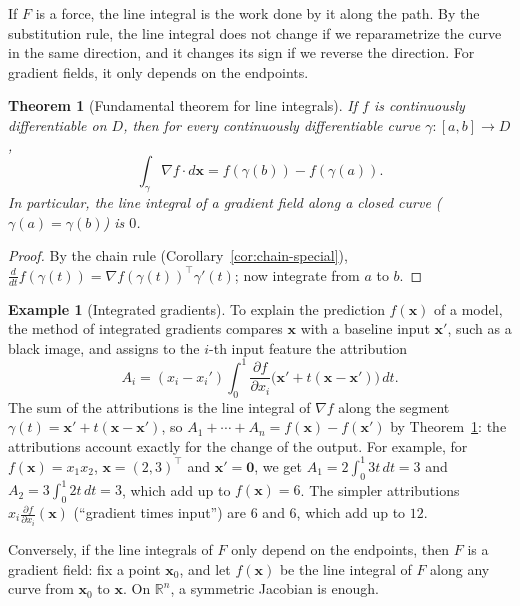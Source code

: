 \documentclass[11pt]{article}
\theoremstyle{definition}
\newtheorem{example}[definition]{Example}
\theoremstyle{plain}
\newtheorem{theorem}[definition]{Theorem}
\theoremstyle{remark}
\begin{document}
If $F$ is a force, the line integral is the work done by it along the path. By the substitution rule, the line integral does not change if we reparametrize the curve in the same direction, and it changes its sign if we reverse the direction. For gradient fields, it only depends on the endpoints.

\begin{theorem}[Fundamental theorem for line integrals]\label{thm:gradient-theorem}
    If $f$ is continuously differentiable on $D$, then for every continuously differentiable curve $\gamma: [a, b] \to D$,
    \[\int_\gamma \nabla f \cdot d\mathbf{x} = f(\gamma(b)) - f(\gamma(a)).\]
    In particular, the line integral of a gradient field along a closed curve ($\gamma(a) = \gamma(b)$) is $0$.
\end{theorem}

\begin{proof}
    By the chain rule (Corollary~\ref{cor:chain-special}), $\frac{d}{dt}f(\gamma(t)) = \nabla f(\gamma(t))^\top\gamma'(t)$; now integrate from $a$ to $b$.
\end{proof}

\begin{example}[Integrated gradients]\label{ex:integrated-gradients}
    To explain the prediction $f(\mathbf{x})$ of a model, the method of integrated gradients compares $\mathbf{x}$ with a baseline input $\mathbf{x}'$, such as a black image, and assigns to the $i$-th input feature the attribution
    \[A_i = (x_i - x_i')\int_0^1 \frac{\partial f}{\partial x_i}\big(\mathbf{x}' + t(\mathbf{x} - \mathbf{x}')\big)\, dt.\]
    The sum of the attributions is the line integral of $\nabla f$ along the segment $\gamma(t) = \mathbf{x}' + t(\mathbf{x} - \mathbf{x}')$, so $A_1 + \cdots + A_n = f(\mathbf{x}) - f(\mathbf{x}')$ by Theorem~\ref{thm:gradient-theorem}: the attributions account exactly for the change of the output. For example, for $f(\mathbf{x}) = x_1x_2$, $\mathbf{x} = (2, 3)^\top$ and $\mathbf{x}' = \mathbf{0}$, we get $A_1 = 2\int_0^1 3t\, dt = 3$ and $A_2 = 3\int_0^1 2t\, dt = 3$, which add up to $f(\mathbf{x}) = 6$. The simpler attributions $x_i\frac{\partial f}{\partial x_i}(\mathbf{x})$ (``gradient times input'') are $6$ and $6$, which add up to $12$.
\end{example}

Conversely, if the line integrals of $F$ only depend on the endpoints, then $F$ is a gradient field: fix a point $\mathbf{x}_0$, and let $f(\mathbf{x})$ be the line integral of $F$ along any curve from $\mathbf{x}_0$ to $\mathbf{x}$. On $\mathbb{R}^n$, a symmetric Jacobian is enough.
\end{document}
